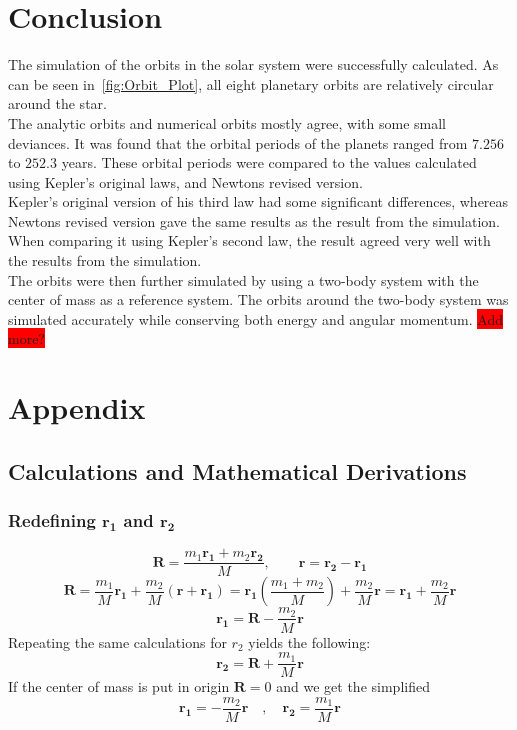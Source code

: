 \documentclass[reprint,english,notitlepage]{revtex4-2}
\begin{document}
\section{Conclusion}
The simulation of the orbits in the solar system were successfully calculated.
As can be seen in~\ref{fig:Orbit_Plot}, all eight planetary orbits are relatively circular around the star.\\
The analytic orbits and numerical orbits mostly agree, with some small deviances.
It was found that the orbital periods of the planets ranged from $7.256$ to $252.3$ years.
These orbital periods were compared to the values calculated using Kepler's original laws, and Newtons revised version.\\
Kepler's original version of his third law had some significant differences, whereas Newtons revised version gave the same results as the result from the simulation.
When comparing it using Kepler's second law, the result agreed very well with the results from the simulation.\\

The orbits were then further simulated by using a two-body system with the center of mass as a reference system.
The orbits around the two-body system was simulated accurately while conserving both energy and angular momentum.
\colorbox{red}{Add more?}

\section{Appendix}

	\subsection{Calculations and Mathematical Derivations}
		\subsubsection{Redefining $ \mathbf{r_1} $ and $ \mathbf{r_2} $}\label{r1r2 calc}
			\[
			\mathbf{R} = \frac{m_1 \mathbf{r_1} + m_2 \mathbf{r_2}}{M}, \qquad \mathbf{r} = \mathbf{r_2} - \mathbf{r_1}
			\]
			\[
			\mathbf{R} = \frac{m_1}{M}\mathbf{r_1} + \frac{m_2}{M} \left( \mathbf{r} + \mathbf{r_1} \right) = \mathbf{r_1} \left( \frac{m_1 + m_2}{M} \right) + \frac{m_2}{M} \mathbf{r} = \mathbf{r_1} + \frac{m_2}{M} \mathbf{r}
			\]
			\[
			\mathbf{r_1} = \mathbf{R} - \frac{m_2}{M}\mathbf{r}
			\]
			Repeating the same calculations for $ r_2 $ yields the following: 
			\[
			\mathbf{r_2} = \mathbf{R} + \frac{m_1}{M} \mathbf{r}
			\]
			If the center of mass is put in origin $ \mathbf{R} = 0 $ and we get the simplified
			\[
			\mathbf{r_1} = - \frac{m_2}{M}\mathbf{r} \quad , \quad \mathbf{r_2} = \frac{m_1}{M}\mathbf{r}
			\]
\end{document}

